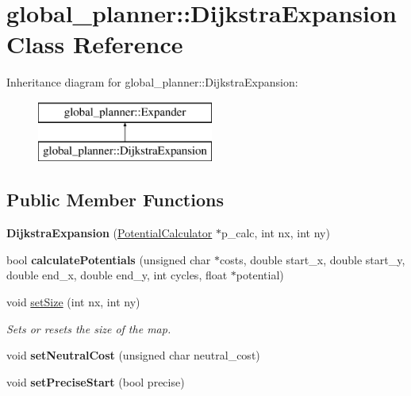 \hypertarget{classglobal__planner_1_1_dijkstra_expansion}{}\section{global\+\_\+planner\+:\+:Dijkstra\+Expansion Class Reference}
\label{classglobal__planner_1_1_dijkstra_expansion}
Inheritance diagram for global\+\_\+planner\+:\+:Dijkstra\+Expansion\+:\begin{figure}[H]
\begin{center}
\leavevmode
\includegraphics[height=2.000000cm]{classglobal__planner_1_1_dijkstra_expansion}
\end{center}
\end{figure}
\subsection*{Public Member Functions}
\begin{DoxyCompactItemize}
\item 
\mbox{\label{classglobal__planner_1_1_dijkstra_expansion_a58e6885deccbdab45ecda172bb74c702}} 
{\bfseries Dijkstra\+Expansion} (\mbox{\hyperlink{classglobal__planner_1_1_potential_calculator}{Potential\+Calculator}} $\ast$p\+\_\+calc, int nx, int ny)
\item 
\mbox{\label{classglobal__planner_1_1_dijkstra_expansion_a1102e169bb79dac31de8fe5ca5ace39b}} 
bool {\bfseries calculate\+Potentials} (unsigned char $\ast$costs, double start\+\_\+x, double start\+\_\+y, double end\+\_\+x, double end\+\_\+y, int cycles, float $\ast$potential)
\item 
void \mbox{\hyperlink{classglobal__planner_1_1_dijkstra_expansion_a7d286126b2c478fc55c5e995e1deff29}{set\+Size}} (int nx, int ny)
\begin{DoxyCompactList}\small\item\em Sets or resets the size of the map. \end{DoxyCompactList}\item 
\mbox{\label{classglobal__planner_1_1_dijkstra_expansion_a2ec5a9b73f4a8680adc8e406bc18b254}} 
void {\bfseries set\+Neutral\+Cost} (unsigned char neutral\+\_\+cost)
\item 
\mbox{\label{classglobal__planner_1_1_dijkstra_expansion_a5ba5aa2bff86fd1b18b24163379d9e2b}} 
void {\bfseries set\+Precise\+Start} (bool precise)
\end{DoxyCompactItemize}
